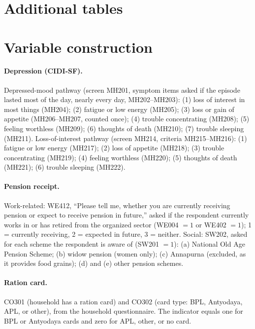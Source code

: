 \documentclass[11pt]{article}
\begin{document}
\appendix

\section{Additional tables}





\section{Variable construction}\label{app:construction}

\paragraph{Depression (CIDI-SF).} Depressed-mood pathway (screen MH201,
symptom items asked if the episode lasted most of the day, nearly every day,
MH202--MH203): (1) loss of interest in most things (MH204); (2) fatigue or low
energy (MH205); (3) loss or gain of appetite (MH206--MH207, counted once); (4)
trouble concentrating (MH208); (5) feeling worthless (MH209); (6) thoughts of
death (MH210); (7) trouble sleeping (MH211). Loss-of-interest pathway (screen
MH214, criteria MH215--MH216): (1) fatigue or low energy (MH217); (2) loss of
appetite (MH218); (3) trouble concentrating (MH219); (4) feeling worthless
(MH220); (5) thoughts of death (MH221); (6) trouble sleeping (MH222).

\paragraph{Pension receipt.} Work-related: WE412, ``Please tell me, whether
you are currently receiving pension or expect to receive pension in future,''
asked if the respondent currently works in or has retired from the organized
sector (WE004 $= 1$ or WE402 $= 1$); 1 = currently receiving, 2 = expected in
future, 3 = neither. Social: SW202, asked for each scheme the respondent is
aware of (SW201 $= 1$): (a) National Old Age Pension Scheme; (b) widow pension
(women only); (c) Annapurna (excluded, as it provides food grains); (d) and
(e) other pension schemes.

\paragraph{Ration card.} CO301 (household has a ration card) and CO302 (card
type: BPL, Antyodaya, APL, or other), from the household questionnaire. The
indicator equals one for BPL or Antyodaya cards and zero for APL, other, or no
card.
\end{document}
